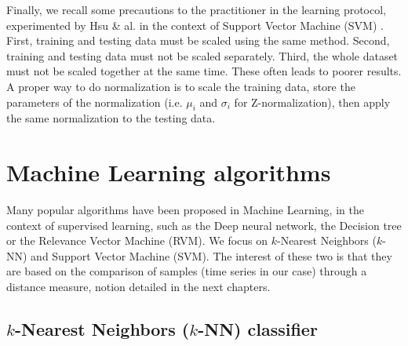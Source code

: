 Finally, we recall some precautions to the practitioner in the learning protocol, experimented by Hsu \& al. in the context of Support Vector Machine (SVM) \cite{Hsu2008}. First, training and testing data must be scaled using the same method. Second, training and testing data must not be scaled separately. Third, the whole dataset must not be scaled together at the same time. These often leads to poorer results. A proper way to do normalization is to scale the training data, store the parameters of the normalization (i.e. $\mu_i$ and $\sigma_i$ for Z-normalization), then apply the same normalization to the testing data. 


\newpage
\section{Machine Learning algorithms}

Many popular algorithms have been proposed in Machine Learning, in the context of supervised learning, such as the Deep neural network, the Decision tree or the Relevance Vector Machine (RVM). We focus on $k$-Nearest Neighbors ($k$-NN) and Support Vector Machine (SVM). The interest of these two is that they are based on the comparison of samples (time series in our case) through a distance measure, notion detailed in the next chapters.  


\subsection{$k$-Nearest Neighbors ($k$-NN) classifier}
\label{sec:kNN}

